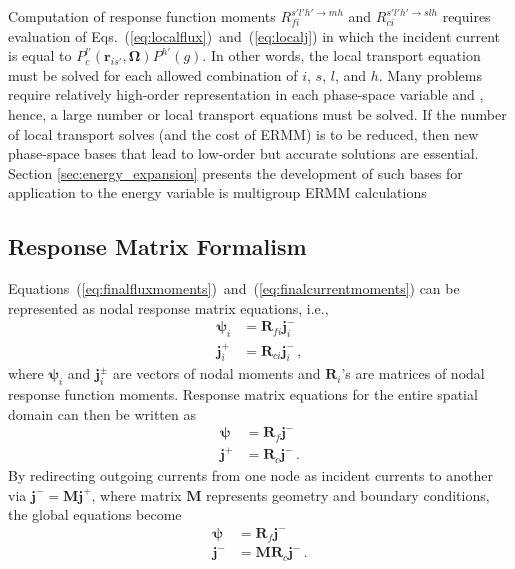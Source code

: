 \documentclass[5p,times,twocolumn,10pt]{elsarticle}
\newcommand{\EQSTWO}[2]{Eqs.~(\ref{#1})~and~(\ref{#2})}
\newcommand{\EQUATIONSTWO}[2]{Equations~(\ref{#1})~and~(\ref{#2})}
\begin{document}
    Computation of response function moments $R^{s'l'h' \to mh}_{fi}$ and
    $R^{s'l'h' \to slh}_{ci}$ requires evaluation of
    \EQSTWO{eq:localflux}{eq:localj} in which the incident current is equal to
    $P^{l'}_c(\mathbf{r}_{is'}, \bm{\Omega}) P^{h'}(g)$. In other words, the
    local transport equation must be solved for each allowed combination
    of $i$, $s$, $l$, and $h$. Many problems require relatively high-order
    representation in each phase-space variable and , hence, a large number or
    local transport equations must be solved.  If the number of local transport
    solves (and the cost of ERMM) is to be reduced, then new phase-space bases
    that lead to low-order but accurate solutions are essential.  Section
    \ref{sec:energy_expansion}
    presents the development of such bases for application to the energy
    variable is multigroup ERMM calculations

    \subsection{Response Matrix Formalism}

    \EQUATIONSTWO{eq:finalfluxmoments}{eq:finalcurrentmoments} can be
    represented as nodal response matrix equations, i.e.,
    \begin{equation}
        \begin{split}
            \bm{\psi}_i    &=  \mathbf{R}_{fi}  \mathbf{j}^-_i  \\
            \mathbf{j}^+_i &=  \mathbf{R}_{ci} \mathbf{j}^-_i  \, ,
        \end{split}
    \end{equation}
    where  $\bm{\psi}_i$ and $\mathbf{j}^{\pm}_i$ are vectors of nodal moments
    and $\mathbf{R}_i$'s are matrices of nodal response function moments.
    Response matrix equations for the entire spatial domain can then be written
    as
    \begin{equation}
        \begin{split}
            \bm{\psi}    &= \mathbf{R}_{f} \mathbf{j}^-  \\
            \mathbf{j}^+ &= \mathbf{R}_{c}  \mathbf{j}^- \, .
        \end{split}
    \end{equation}
    By redirecting outgoing currents from one node as incident currents to
    another via $\mathbf{j}^- = \mathbf{Mj}^+$, where matrix $\mathbf{M}$
    represents geometry and boundary conditions, the global equations become
    \begin{equation}
        \begin{split}
            \bm{\psi}    &= \mathbf{R}_{f}  \mathbf{j}^-  \\
            \mathbf{j}^- &= \mathbf{MR}_{c}   \mathbf{j}^- \, .
            \label{eq:globalrme}
        \end{split}
    \end{equation}
\end{document}
